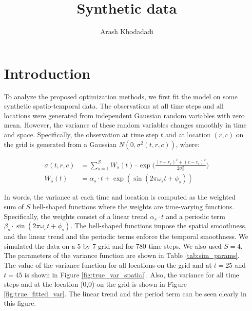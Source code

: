 \documentclass[12pt]{article}
\title{Synthetic data}
\author{Arash Khodadadi}
\begin{document}
\maketitle

\section{Introduction}

To analyze the proposed optimization methods, we first fit the model on some synthetic spatio-temporal data. The observations at all time steps and all locations were generated from independent Gaussian random variables with zero mean. However, the variance of these random variables changes smoothly in time and space. Specifically, the observation at time step $t$ and at location $(r,c)$ on the grid is generated from a Gaussian $N(0,\sigma^2(t,r,c))$, where:

\begin{equation}
\begin{aligned}
\sigma(t,r,c) & =\sum_{s=1}^{S} W_s(t) \cdot \exp\bigg( \frac{(r-r_s)^2+(c-c_s)^2}{2\sigma_s^2} \bigg) \\
W_s(t) & =\alpha_s \cdot t + \exp(\sin(2\pi\omega_s t+\phi_s)) 
\label{eq:sourceVar}
\end{aligned}
\end{equation}

In words, the variance at each time and location is computed as the weighted sum of $S$ bell-shaped functions where the weights are time-varying functions. Specifically, the weights consist of a linear trend $\alpha_s \cdot t$ and a periodic term $\beta_s \cdot \sin(2\pi\omega_s t+\phi_s)$. The bell-shaped functions impose the spatial smoothness, and the linear trend and the periodic terms enforce the temporal smoothness. We simulated the data on a 5 by 7 grid and for 780 time steps. We also used $S=4$. The parameters of the variance function are shown in Table \ref{tab:sim_params}. The value of the variance function for all locations on the grid and at $t=25$ and $t=45$ is shown in Figure \ref{fig:true_var_spatial}. Also, the variance for all time steps and at the location (0,0) on the grid is shown in Figure \ref{fig:true_fitted_var}. The linear trend and the period term can be seen clearly in this figure.
\end{document}
